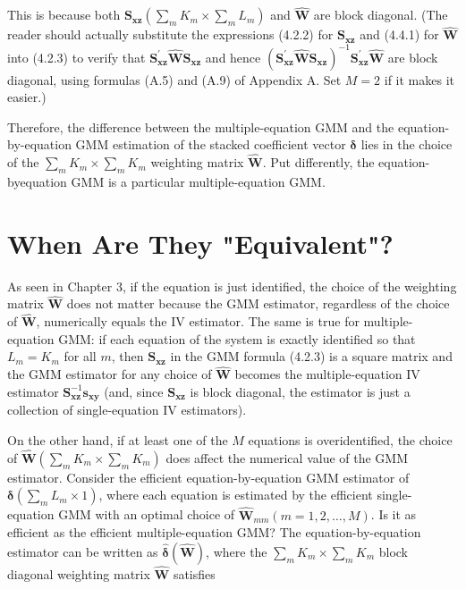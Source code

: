 \documentclass[10pt]{article}
\begin{document}
This is because both $\mathbf{S}_{\mathbf{x z}}\left(\sum_{m} K_{m} \times \sum_{m} L_{m}\right)$ and $\widehat{\mathbf{W}}$ are block diagonal. (The reader should actually substitute the expressions (4.2.2) for $\mathbf{S}_{\mathbf{x z}}$ and (4.4.1) for $\widehat{\mathbf{W}}$ into (4.2.3) to verify that $\mathbf{S}_{\mathbf{x z}}^{\prime} \widehat{\mathbf{W}} \mathbf{S}_{\mathbf{x z}}$ and hence $\left(\mathbf{S}_{\mathbf{x z}}^{\prime} \widehat{\mathbf{W}} \mathbf{S}_{\mathbf{x z}}\right)^{-1} \mathbf{S}_{\mathbf{x z}}^{\prime} \widehat{\mathbf{W}}$ are block diagonal, using formulas (A.5) and (A.9) of Appendix A. Set $M=2$ if it makes it easier.)

Therefore, the difference between the multiple-equation GMM and the equation-by-equation GMM estimation of the stacked coefficient vector $\boldsymbol{\delta}$ lies in the choice of the $\sum_{m} K_{m} \times \sum_{m} K_{m}$ weighting matrix $\widehat{\mathbf{W}}$. Put differently, the equation-byequation GMM is a particular multiple-equation GMM.

\section*{When Are They "Equivalent"?}
As seen in Chapter 3, if the equation is just identified, the choice of the weighting matrix $\widehat{\mathbf{W}}$ does not matter because the GMM estimator, regardless of the choice of $\widehat{\mathbf{W}}$, numerically equals the IV estimator. The same is true for multiple-equation GMM: if each equation of the system is exactly identified so that $L_{m}=K_{m}$ for all $m$, then $\mathbf{S}_{\mathbf{x z}}$ in the GMM formula (4.2.3) is a square matrix and the GMM estimator for any choice of $\widehat{\mathbf{W}}$ becomes the multiple-equation IV estimator $\mathbf{S}_{\mathbf{x z}}^{-1} \mathbf{s}_{\mathbf{x y}}$ (and, since $\mathbf{S}_{\mathbf{x z}}$ is block diagonal, the estimator is just a collection of single-equation IV estimators).

On the other hand, if at least one of the $M$ equations is overidentified, the choice of $\widehat{\mathbf{W}}\left(\sum_{m} K_{m} \times \sum_{m} K_{m}\right)$ does affect the numerical value of the GMM estimator. Consider the efficient equation-by-equation GMM estimator of $\boldsymbol{\delta}\left(\sum_{m} L_{m} \times 1\right)$, where each equation is estimated by the efficient single-equation GMM with an optimal choice of $\widehat{\mathbf{W}}_{m m}(m=1,2, \ldots, M)$. Is it as efficient as the efficient multiple-equation GMM? The equation-by-equation estimator can be written as $\hat{\boldsymbol{\delta}}(\widehat{\mathbf{W}})$, where the $\sum_{m} K_{m} \times \sum_{m} K_{m}$ block diagonal weighting matrix $\widehat{\mathbf{W}}$ satisfies
\end{document}
